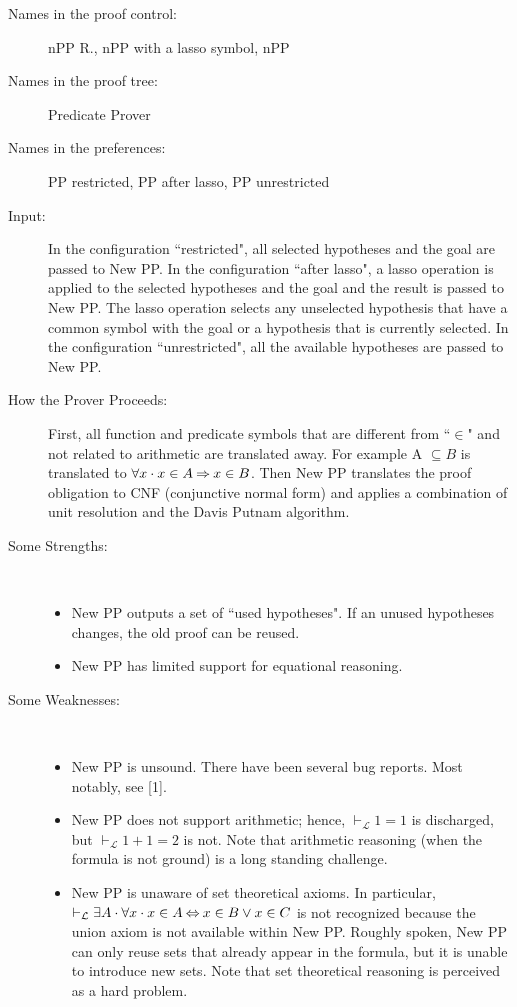 \begin{description}
	\item[Names in the proof control:] nPP R., nPP with a lasso symbol, nPP
	\item[Names in the proof tree:] Predicate Prover
	\item[Names in the preferences:] PP restricted, PP after lasso, PP unrestricted
	\item[Input:] In the configuration ``restricted", all selected hypotheses and the goal are passed to New PP. In the configuration ``after lasso", a lasso operation is applied to the selected hypotheses and the goal and the result is passed to New PP. The lasso operation selects any unselected hypothesis that have a common symbol with the goal or a hypothesis that is currently selected. In the configuration ``unrestricted", all the available hypotheses are passed to New PP.
	\item[How the Prover Proceeds:] First, all function and predicate symbols that are different from ``$\in$" and not related to arithmetic are translated away. For example A $\subseteq B$ is translated to $\forall x\cdot x \in A \mathbin\Rightarrow x \in B$. Then New PP translates the proof obligation to CNF (conjunctive normal form) and applies a combination of unit resolution and the Davis Putnam algorithm.
	\item[Some Strengths:] ~
	\begin{itemize}
		\item New PP outputs a set of ``used hypotheses". If an unused hypotheses changes, the old proof can be reused.
		\item New PP has limited support for equational reasoning. 
	\end{itemize}
	\item[Some Weaknesses:] ~
	\begin{itemize}
		\item New PP is unsound. There have been several bug reports. Most notably, see [1]. 
		\item New PP does not support arithmetic; hence, $\vdash_{\mathcal L} 1=1$ is discharged, but $\vdash_{\mathcal L} 1+1=2$ is not. Note that arithmetic 	reasoning (when the formula is not ground) is a long standing challenge.
		\item New PP is unaware of set theoretical axioms. In particular, $\vdash_{\mathcal L} \exists A\cdot \forall x\cdot x \in A \mathbin\Leftrightarrow x \in B \lor x \in C$ is not recognized because the union axiom is not available within New PP. Roughly spoken, New PP can only reuse sets that already appear in the formula, but it is unable to introduce new sets. Note that set theoretical reasoning is perceived as a hard problem.

\end{itemize}
\end{description}

